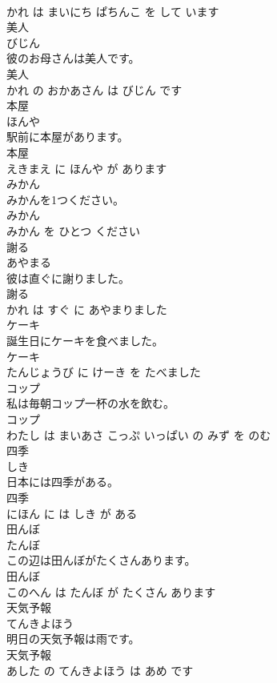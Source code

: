 \documentclass[8pt]{extreport}
\begin{document}
\begin{CJK}{UTF8}{min}
\\	かれ は まいにち ぱちんこ を して います			
\\	美人	
\\	びじん			
\\	彼のお母さんは美人です。	
\\	美人 
\\	かれ の おかあさん は びじん です			
\\	本屋	
\\	ほんや			
\\	駅前に本屋があります。	
\\	本屋 
\\	えきまえ に ほんや が あります			
\\	みかん	
\\	みかんを1つください。	
\\	みかん 
\\	みかん を ひとつ ください			
\\	謝る	
\\	あやまる			
\\	彼は直ぐに謝りました。	
\\	謝る 
\\	かれ は すぐ に あやまりました			
\\	ケーキ	
\\	誕生日にケーキを食べました。	
\\	ケーキ 
\\	たんじょうび に けーき を たべました			
\\	コップ	
\\	私は毎朝コップ一杯の水を飲む。	
\\	コップ 
\\	わたし は まいあさ こっぷ いっぱい の みず を のむ			
\\	四季	
\\	しき			
\\	日本には四季がある。	
\\	四季 
\\	にほん に は しき が ある			
\\	田んぼ	
\\	たんぼ			
\\	この辺は田んぼがたくさんあります。	
\\	田んぼ 
\\	このへん は たんぼ が たくさん あります			
\\	天気予報	
\\	てんきよほう			
\\	明日の天気予報は雨です。	
\\	天気予報 
\\	あした の てんきよほう は あめ です			

\end{CJK}
\end{document}
